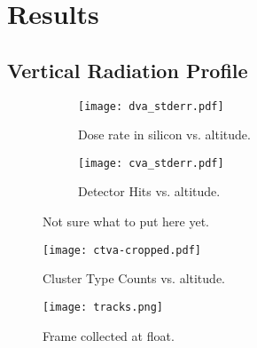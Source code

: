 \section{Results}
\label{Results}

\subsection{Vertical Radiation Profile}
\begin{figure}[H]
\centering
\begin{subfigure}{.5\textwidth}
  \centering
  \texttt{[image: dva\_stderr.pdf]}
  \caption{Dose rate in silicon vs. altitude.}
  \label{fig:sub1}
\end{subfigure}%
\begin{subfigure}{.5\textwidth}
  \centering
  \texttt{[image: cva\_stderr.pdf]}
  \caption{Detector Hits vs. altitude.}
  \label{fig:sub2}
\end{subfigure}
\caption{Not sure what to put here yet.}
\label{fig:test}
\end{figure}

\begin{figure}[H]
\centering
\texttt{[image: ctva-cropped.pdf]}
\caption{Cluster Type Counts vs. altitude.}
\end{figure}

\begin{figure}[H]
\centering
\texttt{[image: tracks.png]}
\caption{Frame collected at float.}
\end{figure}
